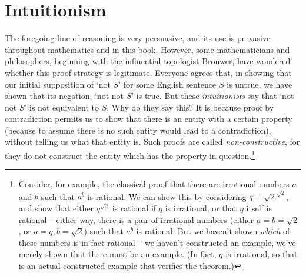 \section{Intuitionism} The foregoing line of reasoning is very persuasive, and its use is pervasive throughout mathematics and in this book. However, some mathematicians and philosophers, beginning with the influential topologist Brouwer, have wondered whether this proof strategy is legitimate. Everyone agrees that, in showing that our initial supposition of `not $S$' for some English sentence $S$ is untrue, we have shown that its negation, `not not $S$' is true. But these \emph{intuitionists} say that `not not $S$' is not equivalent to $S$. Why do they say this? It is because proof by contradiction permits us to show that there is an entity with a certain property (because to assume there is no such entity would lead to a contradiction), without telling us what that entity is. Such proofs are called \emph{non-constructive}, for they do not construct the entity which has the property in question.\footnote{Consider, for example, the classical proof that there are irrational numbers $a$ and $b$ such that $a^{b}$ is rational. We can show this by considering $q=\sqrt{2}^{\sqrt{2}}$, and show that either $q^{\sqrt{2}}$ is rational if $q$ is irrational, or that $q$ itself is rational – either way, there is a pair of irrational numbers (either $a = b = \sqrt{2}$, or $a=q, b=\sqrt{2}$) such that $a^{b}$ is rational. But we haven't shown \emph{which} of these numbers is in fact rational – we haven't constructed an example, we've merely shown that there must be an example. (In fact, $q$ is irrational, so that is an actual constructed example that verifies the theorem.)} 

